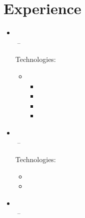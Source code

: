 \documentclass[11pt,a4paper]{article}
\begin{document}
\section{Experience}
\begin{itemize}[leftmargin=0pt,label={},itemsep=2em,topsep=0pt]
\item \parbox{\textwidth}{\textbf{\KhonraadName} \hfill \textit{\KhonraadLocation}}\\
\textit{\KhonraadThirdJobTitle} \hfill \textit{\KhonraadFirstJobStart\,--\,\KhonraadThirdJobEnd}

\vspace{0.2cm}
{\color{secondary}Technologies:} \KhonraadTechnology
\vspace{0.3cm}
\begin{itemize}[leftmargin=*,topsep=-6pt,parsep=0pt,partopsep=0pt,itemsep=0pt]
    \item \KhonraadInnovation
    \begin{itemize}[leftmargin=*,topsep=0pt,parsep=0pt,partopsep=0pt,itemsep=0pt,label={--}]
        \item \KhonraadChatbots
        \item \KhonraadMobile
        \item \KhonraadAndroid
        \item \KhonraadMPS
    \end{itemize}
\end{itemize} 


\item \parbox{\textwidth}{\textbf{\McfunshineName} \hfill \textit{\McfunshineLocation}}\\
\textit{\McfunshineJobTitle} \hfill \textit{\McfunshineJobStart\,--\,\McfunshineJobEnd}

\vspace{0.2cm}
{\color{secondary}Technologies:} \McfunshinePodmorphTechnology
\vspace{0.3cm}
\begin{itemize}[leftmargin=*,topsep=-6pt,parsep=0pt,partopsep=0pt,itemsep=0pt]
    \item \McfunshinePodmorph
    \item \McfunshinePodmorphAI
\end{itemize}


\item \parbox{\textwidth}{\textbf{\BakerName} \hfill \textit{\BakerLocation}}\\
\textit{\BakerSecondJobTitle} \hfill \textit{\BakerFirstJobStart\,--\,\BakerSecondJobEnd}


\end{itemize}
\end{document}
